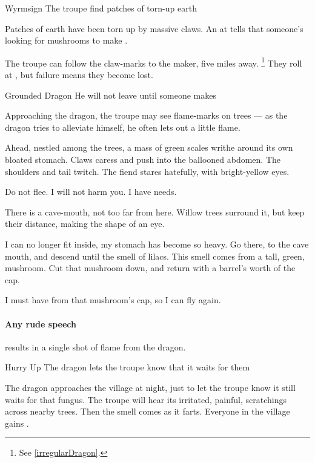 \documentclass[10pt,twoside]{book}
\begin{document}
{Wyrmsign}%
{The troupe find patches of torn-up earth}%

Patches of earth have been torn up by massive claws.
An  at \tn[12] tells  that someone's looking for mushrooms to make .

The troupe can follow the claw-marks to the maker, five miles away.%
\footnote{See \vref{irregularDragon}.}
They roll  at \tn[6], but failure means they become lost.

{Grounded Dragon}%
{He will not leave until someone makes }%

\label{irregularDragon}

Approaching the dragon, the troupe may see flame-marks on trees --- as the dragon tries to alleviate himself, he often lets out a little flame.

\begin{boxtext}
  Ahead, nestled among the trees, a mass of green scales writhe around its own bloated stomach.
  Claws caress and push into the ballooned abdomen.
  The shoulders and tail twitch.
  The \gls{fiend} stares hatefully, with bright-yellow eyes.
\end{boxtext}

\begin{speechtext}
  Do not flee.
  I will not harm you.
  I have needs.

  There is a cave-mouth, not too far from here.
  Willow trees surround it, but keep their distance, making the shape of an eye.

  I can no longer fit inside, my stomach has become so heavy.
  Go there, to the cave mouth, and descend until the smell of lilacs.
  This smell comes from a tall, green, mushroom.
  Cut that mushroom down, and return with a barrel's worth of the cap.

  I must have  from that mushroom's cap, so I can fly again.
\end{speechtext}

\paragraph{Any rude speech}
results in a single shot of flame from the dragon.

{Hurry Up}%
{The dragon lets the troupe know that it waits for them}%

The dragon approaches the \gls{village} at night, just to let the troupe know it still waits for that fungus.
The troupe will hear its irritated, painful, scratchings across nearby trees.
Then the smell comes as it farts.
Everyone in the \gls{village} gains .
\end{document}
